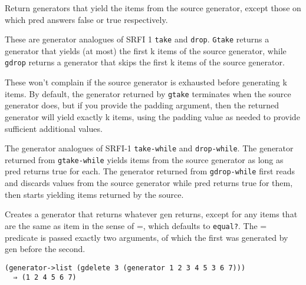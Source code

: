 \begin{entry}{%
  }

Return generators that yield the items from the source generator, except
those on which pred answers false or true respectively.
\end{entry}

\begin{entry}{%
  }

These are generator analogues of SRFI 1 \texttt{take} and \texttt{drop}.
\texttt{Gtake} returns a generator that yields (at most) the first k
items of the source generator, while \texttt{gdrop} returns a generator
that skips the first k items of the source generator.

These won't complain if the source generator is exhausted before
generating k items. By default, the generator returned by \texttt{gtake}
terminates when the source generator does, but if you provide the
padding argument, then the returned generator will yield exactly k
items, using the padding value as needed to provide sufficient
additional values.
\end{entry}

\begin{entry}{%
  }

The generator analogues of SRFI-1 \texttt{take-while} and
\texttt{drop-while}. The generator returned from \texttt{gtake-while}
yields items from the source generator as long as pred returns true for
each. The generator returned from \texttt{gdrop-while} first reads and
discards values from the source generator while pred returns true for
them, then starts yielding items returned by the source.
\end{entry}

\begin{entry}{%
  }

Creates a generator that returns whatever gen returns, except for any
items that are the same as item in the sense of =, which defaults to
\texttt{equal?}. The = predicate is passed exactly two arguments, of
which the first was generated by gen before the second.

\begin{verbatim}
(generator->list (gdelete 3 (generator 1 2 3 4 5 3 6 7)))
  ⇒ (1 2 4 5 6 7)
\end{verbatim}
\end{entry}

